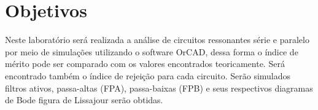 \newpage
\section{Objetivos}
Neste laboratório será realizada a análise de circuitos ressonantes série e paralelo por meio de simulações utilizando o software OrCAD, dessa forma o índice de mérito pode ser comparado com os valores encontrados teoricamente. Será encontrado também o índice de rejeição para cada circuito. 
Serão simulados filtros ativos, passa-altas (FPA), passa-baixas (FPB) e seus respectivos diagramas de Bode figura de Lissajour serão obtidas.


